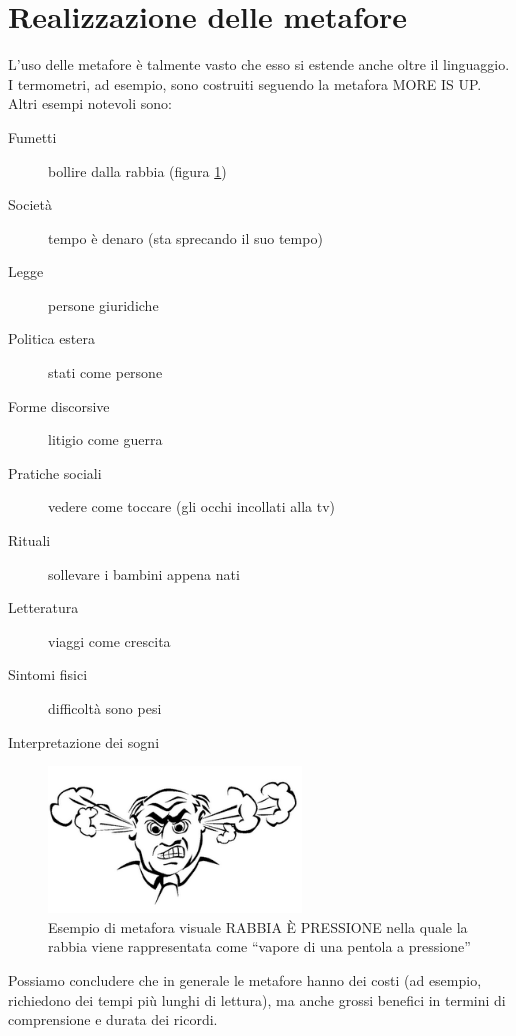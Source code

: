 \section{Realizzazione delle metafore}
L’uso delle metafore è talmente vasto che esso si estende anche oltre il linguaggio. I termometri, ad esempio, sono costruiti seguendo la metafora MORE IS UP. Altri esempi notevoli sono:
\begin{description}
  \item[Fumetti]bollire dalla rabbia (figura \ref{fig:metafora-rabbia})
  \item[Società]tempo è denaro (sta sprecando il suo tempo)
  \item[Legge]persone giuridiche
  \item[Politica estera]stati come persone
  \item[Forme discorsive]litigio come guerra
  \item[Pratiche sociali]vedere come toccare (gli occhi incollati alla tv)  
  \item[Rituali]sollevare i bambini appena nati  
  \item[Letteratura]viaggi come crescita  
  \item[Sintomi fisici]difficoltà sono pesi  
  \item[Interpretazione dei sogni]  
\end{description}

\begin{figure}[hbt]
  \centering
  \includegraphics[width=0.6\textwidth]{img/metafora-rabbia.png}
  \caption{Esempio di metafora visuale RABBIA È PRESSIONE nella quale la rabbia viene rappresentata come ``vapore di una pentola a pressione''}
  \label{fig:metafora-rabbia}
\end{figure}

Possiamo concludere che in generale le metafore hanno dei costi (ad esempio, richiedono dei tempi più lunghi di lettura), ma anche grossi benefici in termini di comprensione e durata dei ricordi.
